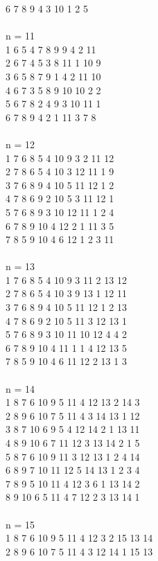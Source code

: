 {6 7 8 9 4 3 10 1 2 5\\
\\
n = 11\\
1 6 5 4 7 8 9 9 4 2 11 \\
2 6 7 4 5 3 8 11 1 10 9\\
3 6 5 8 7 9 1 4 2 11 10\\
4 6 7 3 5 8 9 10 10 2 2\\
5 6 7 8 2 4 9 3 10 11 1\\
6 7 8 9 4 2 1 11 3 7 8\\
\\
n = 12\\
1 7 6 8 5 4 10 9 3 2 11 12 \\
2 7 8 6 5 4 10 3 12 11 1 9\\
3 7 6 8 9 4 10 5 11 12 1 2\\
4 7 8 6 9 2 10 5 3 11 12 1\\
5 7 6 8 9 3 10 12 11 1 2 4\\
6 7 8 9 10 4 12 2 1 11 3 5\\
7 8 5 9 10 4 6 12 1 2 3 11\\
\\
n = 13\\
1 7 6 8 5 4 10 9 3 11 2 13 12\\
2 7 8 6 5 4 10 3 9 13 1 12 11\\
3 7 6 8 9 4 10 5 11 12 1 2 13 \\
4 7 8 6 9 2 10 5 11 3 12 13 1\\
5 7 6 8 9 3 10 11 10 12 4 4 2\\
6 7 8 9 10 4 11 1 1 4 12 13 5\\
7 8 5 9 10 4 6 11 12 2 13 1 3\\
\\
n = 14\\
1 8 7 6 10 9 5 11 4 12 13 2 14 3\\
2 8 9 6 10 7 5 11 4 3 14 13 1 12\\
3 8 7 10 6 9 5 4 12 14 2 1 13 11\\
4 8 9 10 6 7 11 12 3 13 14 2 1 5\\
5 8 7 6 10 9 11 3 12 13 1 2 4 14 \\
6 8 9 7 10 11 12 5 14 13 1 2 3 4\\
7 8 9 5 10 11 4 12 3 6 1 13 14 2\\
8 9 10 6 5 11 4 7 12 2 3 13 14 1\\
\\
n = 15\\
1 8 7 6 10 9 5 11 4 12 3 2 15 13 14\\
2 8 9 6 10 7 5 11 4 3 12 14 1 15 13\\
}
